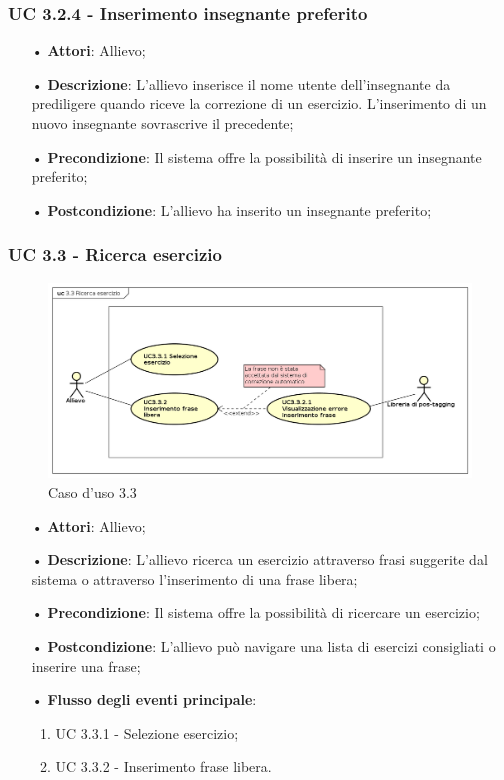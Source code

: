 \subsubsection{UC 3.2.4 - Inserimento insegnante preferito}
\begin{itemize}
\item[•]\textbf{Attori}: Allievo;
\item[•]\textbf{Descrizione}: L’allievo inserisce il nome utente dell’insegnante da prediligere quando riceve la correzione di un esercizio. L’inserimento di un nuovo insegnante sovrascrive il precedente;
\item[•]\textbf{Precondizione}: Il sistema offre la possibilità di inserire un insegnante preferito;
\item[•]\textbf{Postcondizione}: L’allievo ha inserito un insegnante preferito;
\end{itemize}

\subsubsection{UC 3.3 - Ricerca esercizio}
\begin{figure}[H]
\centering
\includegraphics[width=17cm]{img/UC33.png} 
\caption{Caso d'uso 3.3}\label{fig:33}
\end{figure}
\begin{itemize}
\item[•]\textbf{Attori}: Allievo;
\item[•]\textbf{Descrizione}: L’allievo ricerca un esercizio attraverso frasi suggerite dal sistema o attraverso l’inserimento di una frase libera;
\item[•]\textbf{Precondizione}: Il sistema offre la possibilità di ricercare un esercizio;
\item[•]\textbf{Postcondizione}: L’allievo può navigare una lista di esercizi consigliati o inserire una frase;
\item[•]\textbf{Flusso degli eventi principale}:
\begin{enumerate}
\item UC 3.3.1 - Selezione esercizio;
\item UC 3.3.2 - Inserimento frase libera.
\end{enumerate}
\end{itemize}

